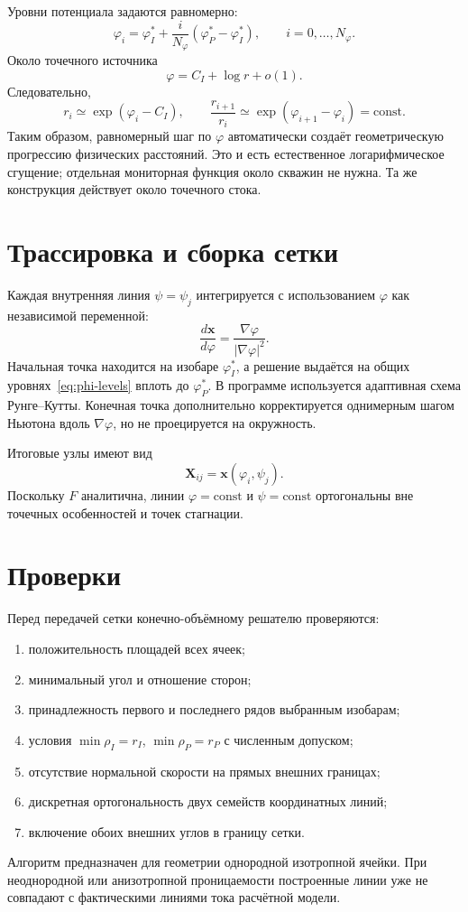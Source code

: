 \documentclass[12pt,a4paper]{article}
\begin{document}
Уровни потенциала задаются равномерно:
\begin{equation}
 \varphi_i=\varphi_I^*+\frac{i}{N_\varphi}
 (\varphi_P^*-\varphi_I^*),\qquad i=0,\ldots,N_\varphi.
 \label{eq:phi-levels}
\end{equation}
Около точечного источника
\[
 \varphi=C_I+\log r+o(1).
\]
Следовательно,
\[
 r_i\simeq\exp(\varphi_i-C_I),\qquad
 \frac{r_{i+1}}{r_i}\simeq
 \exp(\varphi_{i+1}-\varphi_i)=\mathrm{const}.
\]
Таким образом, равномерный шаг по $\varphi$ автоматически создаёт
геометрическую прогрессию физических расстояний. Это и есть естественное
логарифмическое сгущение; отдельная мониторная функция около скважин не нужна.
Та же конструкция действует около точечного стока.

\section{Трассировка и сборка сетки}

Каждая внутренняя линия $\psi=\psi_j$ интегрируется с использованием
$\varphi$ как независимой переменной:
\begin{equation}
 \frac{d\mathbf x}{d\varphi}
 =\frac{\nabla\varphi}{|\nabla\varphi|^2}.
 \label{eq:trace}
\end{equation}
Начальная точка находится на изобаре $\varphi_I^*$, а решение выдаётся на
общих уровнях~\eqref{eq:phi-levels} вплоть до $\varphi_P^*$. В программе
используется адаптивная схема Рунге--Кутты. Конечная точка дополнительно
корректируется однимерным шагом Ньютона вдоль $\nabla\varphi$, но не
проецируется на окружность.

Итоговые узлы имеют вид
\[
 \mathbf X_{ij}=\mathbf x(\varphi_i,\psi_j).
\]
Поскольку $F$ аналитична, линии $\varphi=\mathrm{const}$ и
$\psi=\mathrm{const}$ ортогональны вне точечных особенностей и точек
стагнации.

\section{Проверки}

Перед передачей сетки конечно-объёмному решателю проверяются:
\begin{enumerate}
 \item положительность площадей всех ячеек;
 \item минимальный угол и отношение сторон;
 \item принадлежность первого и последнего рядов выбранным изобарам;
 \item условия $\min\rho_I=r_I$, $\min\rho_P=r_P$ с численным допуском;
 \item отсутствие нормальной скорости на прямых внешних границах;
 \item дискретная ортогональность двух семейств координатных линий;
 \item включение обоих внешних углов в границу сетки.
\end{enumerate}

Алгоритм предназначен для геометрии однородной изотропной ячейки. При
неоднородной или анизотропной проницаемости построенные линии уже не совпадают
с фактическими линиями тока расчётной модели.
\end{document}
